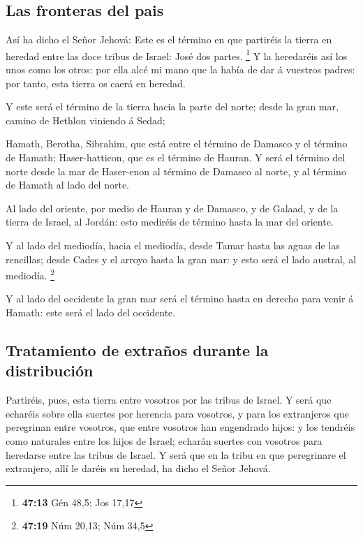 \hypertarget{las-fronteras-del-pais}{%
\subsection{Las fronteras del pais}\label{las-fronteras-del-pais}}

 Así ha dicho el Señor Jehová: Este es el término en que
partiréis la tierra en heredad entre las doce tribus de Israel: José dos
partes. \footnote{\textbf{47:13} Gén 48,5; Jos 17,17}  Y
la heredaréis así los unos como los otros: por ella alcé mi mano que la
había de dar á vuestros padres: por tanto, esta tierra os caerá en
heredad.

 Y este será el término de la tierra hacia la parte del
norte; desde la gran mar, camino de Hethlon viniendo á Sedad;

 Hamath, Berotha, Sibrahim, que está entre el término de
Damasco y el término de Hamath; Haser-hatticon, que es el término de
Hauran.  Y será el término del norte desde la mar de
Haser-enon al término de Damasco al norte, y al término de Hamath al
lado del norte.

 Al lado del oriente, por medio de Hauran y de Damasco, y
de Galaad, y de la tierra de Israel, al Jordán: esto mediréis de término
hasta la mar del oriente.

 Y al lado del mediodía, hacia el mediodía, desde Tamar
hasta las aguas de las rencillas; desde Cades y el arroyo hasta la gran
mar: y esto será el lado austral, al mediodía. \footnote{\textbf{47:19}
  Núm 20,13; Núm 34,5}

 Y al lado del occidente la gran mar será el término
hasta en derecho para venir á Hamath: este será el lado del occidente.

\hypertarget{tratamiento-de-extrauxf1os-durante-la-distribuciuxf3n}{%
\subsection{Tratamiento de extraños durante la
distribución}\label{tratamiento-de-extrauxf1os-durante-la-distribuciuxf3n}}

 Partiréis, pues, esta tierra entre vosotros por las
tribus de Israel.  Y será que echaréis sobre ella suertes
por herencia para vosotros, y para los extranjeros que peregrinan entre
vosotros, que entre vosotros han engendrado hijos: y los tendréis como
naturales entre los hijos de Israel; echarán suertes con vosotros para
heredarse entre las tribus de Israel.  Y será que en la
tribu en que peregrinare el extranjero, allí le daréis su heredad, ha
dicho el Señor Jehová.

